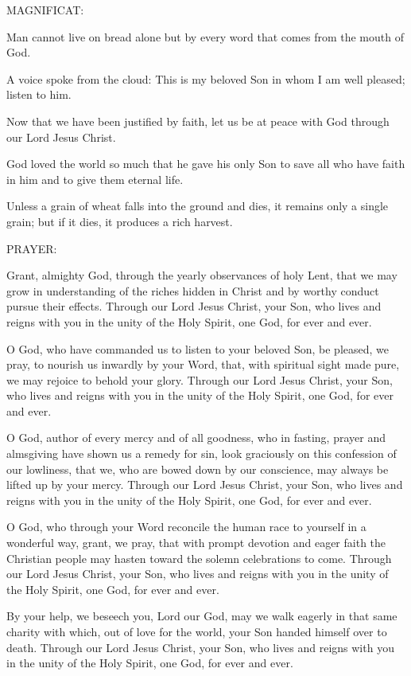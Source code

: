 \noindent MAGNIFICAT:
\begin{description}[labelindent=\parindent, leftmargin=*]
\item [Week 1:]	Man cannot live on bread alone but by every word that comes from the mouth of God.
\item [Week 2:]	A voice spoke from the cloud: This is my beloved Son in whom I am well pleased; listen to him.
\item [Week 3:]	Now that we have been justified by faith, let us be at peace with God through our Lord Jesus Christ.
\item [Week 4:]	God loved the world so much that he gave his only Son to save all who have faith in him and to give them eternal life.
\item [Week 5:]	Unless a grain of wheat falls into the ground and dies, it remains only a single grain; but if it dies, it produces a rich harvest.
\end{description}

\noindent PRAYER:
\begin{description}[labelindent=\parindent, leftmargin=*]
\item [Week 1:]	Grant, almighty God, through the yearly observances of holy Lent, that we may grow in understanding of the riches hidden in Christ and by worthy conduct pursue their effects. Through our Lord Jesus Christ, your Son, who lives and reigns with you in the unity of the Holy Spirit, one God, for ever and ever.
\item [Week 2:]	O God, who have commanded us to listen to your beloved Son, be pleased, we pray, to nourish us inwardly by your Word, that, with spiritual sight made pure, we may rejoice to behold your glory. Through our Lord Jesus Christ, your Son, who lives and reigns with you in the unity of the Holy Spirit, one God, for ever and ever.
\item [Week 3:]	O God, author of every mercy and of all goodness, who in fasting, prayer and almsgiving have shown us a remedy for sin, look graciously on this confession of our lowliness, that we, who are bowed down by our conscience, may always be lifted up by your mercy. Through our Lord Jesus Christ, your Son, who lives and reigns with you in the unity of the Holy Spirit, one God, for ever and ever.
\item [Week 4:]	O God, who through your Word reconcile the human race to yourself in a wonderful way, grant, we pray, that with prompt devotion and eager faith the Christian people may hasten toward the solemn celebrations to come. Through our Lord Jesus Christ, your Son, who lives and reigns with you in the unity of the Holy Spirit, one God, for ever and ever.
\item [Week 5:]	By your help, we beseech you, Lord our God, may we walk eagerly in that same charity with which, out of love for the world, your Son handed himself over to death. Through our Lord Jesus Christ, your Son, who lives and reigns with you in the unity of the Holy Spirit, one God, for ever and ever.
\end{description}

